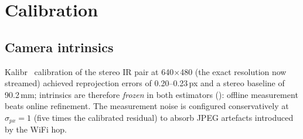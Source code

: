 \section{Calibration}
\label{sec:tuning}

\subsection{Camera intrinsics}
Kalibr~\cite{furgale2013kalibr} calibration of the stereo IR pair at
640$\times$480 (the exact resolution now streamed) achieved reprojection
errors of 0.20--0.23\,px and a stereo baseline of 90.2\,mm; intrinsics are
therefore \emph{frozen} in both estimators ():
offline measurement beats online refinement. The measurement noise is
configured conservatively at $\sigma_{px}=1$ (five times the calibrated
residual) to absorb JPEG artefacts introduced by the WiFi hop.

